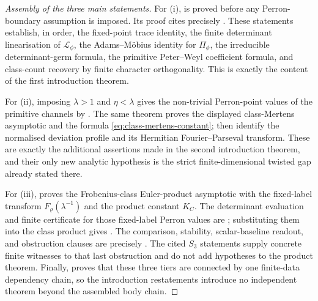 \documentclass[11pt,a4paper]{amsart}
\theoremstyle{plain}
\theoremstyle{definition}
\theoremstyle{remark}
\begin{document}
\begin{proof}[Assembly of the three main statements]
  For \textup{(i)},  is proved before
  any Perron-boundary assumption is imposed.  Its proof cites precisely
  .
  These statements establish, in order, the fixed-point trace identity, the
  finite determinant linearisation of \(\mathcal L_\phi\), the Adams--M\"obius
  identity for \(\Pi_\phi\), the irreducible determinant-germ formula, the
  primitive Peter--Weyl coefficient formula, and class-count recovery by finite
  character orthogonality.  This is exactly the content of the first
  introduction theorem.

  For \textup{(ii)}, imposing \(\lambda>1\) and \(\eta<\lambda\) gives the
  non-trivial Perron-point values of the primitive channels by
  .  The same theorem proves the displayed
  class-Mertens asymptotic and the formula
  \eqref{eq:class-mertens-constant};
   then identify
  the normalised deviation profile and its Hermitian Fourier--Parseval
  transform.  These are exactly the additional assertions made in the second
  introduction theorem, and their only new analytic hypothesis is the strict
  finite-dimensional twisted gap already stated there.

  For \textup{(iii)},  proves the
  Frobenius-class Euler-product asymptotic with the fixed-label transform
  \(F_\varrho(\lambda^{-1})\) and the product constant \(K_C\).  The determinant
  evaluation and finite certificate for those fixed-label Perron values are
  ;
  substituting them into the class product gives
  .
  The comparison, stability, scalar-baseline readout, and obstruction clauses
  are precisely
  .
  The cited \(S_3\) statements supply concrete finite witnesses to that last
  obstruction and do not add hypotheses to the product theorem.  Finally,
   proves that these three
  tiers are connected by one finite-data dependency chain, so the introduction
  restatements introduce no independent theorem beyond the assembled body
  chain.
\end{proof}
\end{document}
